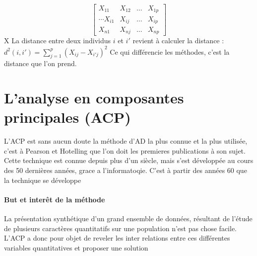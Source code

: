 \documentclass[a4paper]{article}
\begin{document}
\begin{equation*}
    \begin{bmatrix} 
        X_{11} & X_{12} & \ldots & X_{1p} \\
        \cdots 
        X_{i1} & X_{ij} & \ldots & X_{ip} \\
        X_{n1} & X_{nj} & \ldots & X_{np}
    \end{bmatrix} 
\end{equation*}
X
La distance entre deux individus $i$ et $i'$ revient à calculer la distance :  $d^2(i,i') = \sum_{j = 1}^{p}(X_{ij} - X_{i'j})^2$ 
Ce qui différencie les méthodes, c'est la distance que l'on prend. 

\section{L'analyse en composantes principales (ACP)}
L'ACP est sans aucun doute la méthode d'AD la plus connue et la plus utilisée, c'est à Pearson et Hotelling que l'on doit les premieres publications à
son sujet. Cette technique est connue depuis plus d'un siècle, mais s'est développée au cours des 50 dernières années, grace a l'informatoqie. C'est à
partir des années 60 que la technique se développe

\paragraph{But et interêt de la méthode}
La présentation synthétique d'un grand ensemble de données, résultant de l'étude de plusieurs caractères quantitatifs sur une population n'est pas
chose facile. L'ACP a donc pour objet de reveler les inter relations entre ces différentes variables quantitatives et proposer une solution 
\end{document}
